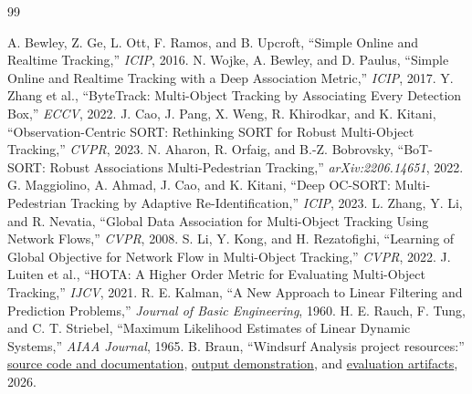 \documentclass[10pt,twocolumn,a4paper]{article}
\begin{document}
\begin{thebibliography}{99}
\footnotesize
\setlength{\itemsep}{-0.3em}

A. Bewley, Z. Ge, L. Ott, F. Ramos, and B. Upcroft,
``Simple Online and Realtime Tracking,'' \emph{ICIP}, 2016.
N. Wojke, A. Bewley, and D. Paulus,
``Simple Online and Realtime Tracking with a Deep Association Metric,'' \emph{ICIP}, 2017.
Y. Zhang et al., ``ByteTrack: Multi-Object Tracking by Associating Every Detection Box,''
\emph{ECCV}, 2022.
J. Cao, J. Pang, X. Weng, R. Khirodkar, and K. Kitani,
``Observation-Centric SORT: Rethinking SORT for Robust Multi-Object Tracking,''
\emph{CVPR}, 2023.
N. Aharon, R. Orfaig, and B.-Z. Bobrovsky,
``BoT-SORT: Robust Associations Multi-Pedestrian Tracking,''
\emph{arXiv:2206.14651}, 2022.
G. Maggiolino, A. Ahmad, J. Cao, and K. Kitani,
``Deep OC-SORT: Multi-Pedestrian Tracking by Adaptive Re-Identification,''
\emph{ICIP}, 2023.
L. Zhang, Y. Li, and R. Nevatia,
``Global Data Association for Multi-Object Tracking Using Network Flows,'' \emph{CVPR}, 2008.
S. Li, Y. Kong, and H. Rezatofighi,
``Learning of Global Objective for Network Flow in Multi-Object Tracking,'' \emph{CVPR}, 2022.
J. Luiten et al., ``HOTA: A Higher Order Metric for Evaluating Multi-Object Tracking,''
\emph{IJCV}, 2021.
R. E. Kalman, ``A New Approach to Linear Filtering and Prediction Problems,''
\emph{Journal of Basic Engineering}, 1960.
H. E. Rauch, F. Tung, and C. T. Striebel,
``Maximum Likelihood Estimates of Linear Dynamic Systems,'' \emph{AIAA Journal}, 1965.
B. Braun, ``Windsurf Analysis project resources:''
\href{https://github.com/BertilBraun/Windsurf-Analysis/tree/windsurf-report-v1.5}{source code and documentation},
\href{https://github.com/BertilBraun/Windsurf-Analysis/blob/windsurf-report-v1.5/documentation/processed.gif}{output demonstration}, and
\href{https://github.com/BertilBraun/Windsurf-Analysis/tree/windsurf-report-v1.5/documentation/tracker_evaluation}{evaluation artifacts}, 2026.
\end{thebibliography}

\clearpage
\appendix
\balance

\end{document}
